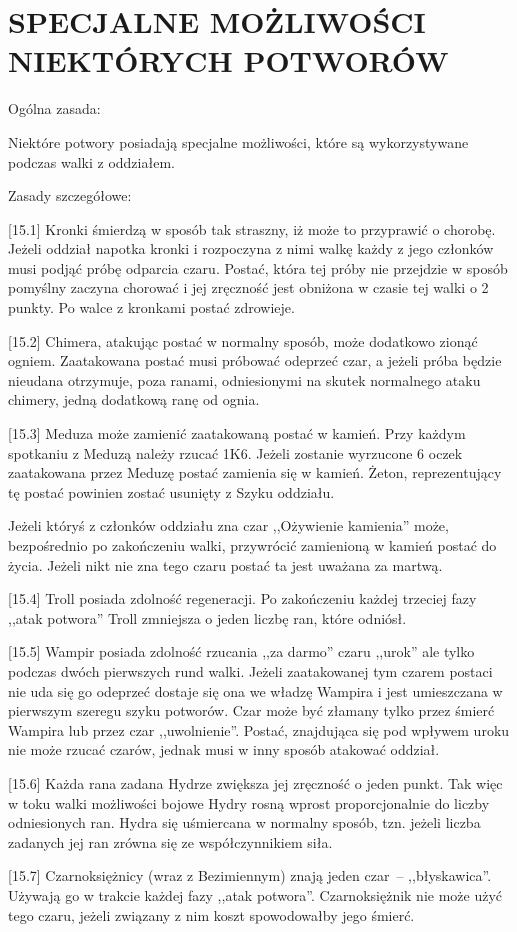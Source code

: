 \section{SPECJALNE MOŻLIWOŚCI NIEKTÓRYCH POTWORÓW}

Ogólna zasada:

Niektóre potwory posiadają specjalne możliwości, które są wykorzystywane podczas walki z oddziałem.

Zasady szczegółowe:

[15.1] Kronki śmierdzą w sposób tak straszny, iż może to przyprawić o chorobę.
Jeżeli oddział napotka kronki i rozpoczyna z nimi walkę każdy z jego członków musi podjąć próbę odparcia czaru.
Postać, która tej próby nie przejdzie w sposób pomyślny zaczyna chorować i jej zręczność jest obniżona w czasie tej walki o 2 punkty.
Po walce z kronkami postać zdrowieje.

[15.2] Chimera, atakując postać w normalny sposób, może dodatkowo zionąć ogniem.
Zaatakowana postać musi próbować odeprzeć czar, a jeżeli próba będzie nieudana otrzymuje, poza ranami, odniesionymi na skutek normalnego ataku chimery, jedną dodatkową ranę od ognia.

[15.3] Meduza może zamienić zaatakowaną postać w kamień.
Przy każdym spotkaniu z Meduzą należy rzucać 1K6.
Jeżeli zostanie wyrzucone 6 oczek zaatakowana przez Meduzę postać zamienia się w kamień.
Żeton, reprezentujący tę postać powinien zostać usunięty z Szyku oddziału.

Jeżeli któryś z członków oddziału zna czar ,,Ożywienie kamienia'' może, bezpośrednio po zakończeniu walki, przywrócić zamienioną w kamień postać do życia.
Jeżeli nikt nie zna tego czaru postać ta jest uważana za martwą.

[15.4] Troll posiada zdolność regeneracji.
Po zakończeniu każdej trzeciej fazy ,,atak potwora'' Troll zmniejsza o jeden liczbę ran, które odniósł.

[15.5] Wampir posiada zdolność rzucania ,,za darmo'' czaru ,,urok'' ale tylko podczas dwóch pierwszych rund walki.
Jeżeli zaatakowanej tym czarem postaci nie uda się go odeprzeć dostaje się ona we władzę Wampira i jest umieszczana w pierwszym szeregu szyku potworów.
Czar może być złamany tylko przez śmierć Wampira lub przez czar ,,uwolnienie''.
Postać, znajdująca się pod wpływem uroku nie może rzucać czarów, jednak musi w inny sposób atakować oddział.

[15.6] Każda rana zadana Hydrze zwiększa jej zręczność o jeden punkt.
Tak więc w toku walki możliwości bojowe Hydry rosną wprost proporcjonalnie do liczby odniesionych ran.
Hydra się uśmiercana w normalny sposób, tzn. jeżeli liczba zadanych jej ran zrówna się ze współczynnikiem siła.

[15.7] Czarnoksiężnicy (wraz z Bezimiennym) znają jeden czar~-- ,,błyskawica''.
Używają go w trakcie każdej fazy ,,atak potwora''.
Czarnoksiężnik nie może użyć tego czaru, jeżeli związany z nim koszt spowodowałby jego śmierć.
